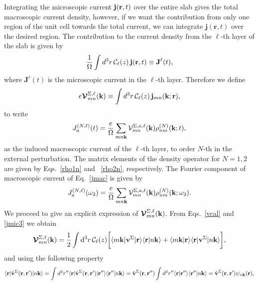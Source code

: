 \documentclass{article}
\begin{document}
Integrating the microscopic current $\mathbf{j}(\mathbf{r},t)$ over
the entire slab gives the total macroscopic current density, 
 however, if we want the
contribution from only one region of the unit cell towards the total
current, we can integrate $\mathbf{j}({\mathbf r},t)$ over the
desired region. The contribution to the current density from the
$\ell$-th layer of the slab is given by
\begin{equation}\label{jsz}
\frac{1}{\Omega}\int d^3r\, {\mathbf{\cal C}}_\ell(z)\, \mathbf{j}(\mathbf{r},t)
 \equiv \mathbf{J}^{\ell}(t),
\end{equation}
where $\mathbf{J}^{\ell}(t)$ is the microscopic current  in the
$\ell$-th layer.
Therefore we define
\begin{equation}\label{vcal}
e{\boldsymbol{\mathcal{V}}}^{\Sigma,\ell}_{mn}(\mathbf{k})
\equiv
\int d^3r\, {\mathbf{\cal C}}_\ell(z)\,\mathbf{j}_{mn}({\mathbf{k}};\mathbf{r}),
\end{equation}
to write
\begin{equation}\label{jmac}
J_a^{(N,\ell)}(t)=\frac{e}{\Omega}
\sum_{mn\mathbf{k}}
\mathcal{V}^{\Sigma,a,\ell}_{mn}(\mathbf{k})
\rho^{(N)}_{nm}(\mathbf{k};t),
\end{equation}
as the induced macroscopic current of the  $\ell$-th layer,
 to order $N$-th in the external
perturbation.
 The matrix elements of the
density operator for $N=1,2$ are given by Eqs.~\eqref{rho1n} and
~\eqref{rho2n}, respectively. 
The Fourier component of macroscopic current of Eq.~\eqref{jmac} is given by
\begin{equation}\label{jmac2}
J_{\mathrm{a}}^{(N,\ell)}(\omega_3)=\frac{e}{\Omega}
\sum_{mn\mathbf{k}}
{\mathbf{\cal V}}^{\Sigma,\mathrm{a},\ell}_{mn}(\mathbf{k})
\rho^{(N)}_{nm}(\mathbf{k};\omega_3)
.
\end{equation}
We proceed to give an explicit expression of
$\boldsymbol{\mathcal{\cal V}}^{\Sigma,\ell}_{mn}(\mathbf{k})$.
From
Eqs.~\eqref{vcal} and \eqref{jmic3} we obtain
\begin{equation}\label{intj}
{\boldsymbol{\mathcal{V}}}^{\Sigma,\ell}_{mn}({\mathbf k})=
\frac{1}{2}
\int \mathrm{d}^3 r\,
 {\mathbf{\cal C}}_\ell(z)
\bigg[
\langle m\mathbf{k}|\mathbf{v}^\Sigma | \mathbf{r}\rangle
\langle \mathbf{r} | n \mathbf k \rangle +
\langle m\mathbf{k} | \mathbf{r}\rangle
\langle \mathbf{r} | \mathbf{v}^\Sigma | n \mathbf k \rangle\bigg]
,
\end{equation}  
and using the following property
\begin{equation}\label{nl.2}
\langle \mathbf{r} | \hat{\mathbf{v}}^\Sigma(\mathbf{r},\mathbf{r}')| n\mathbf{k} \rangle
=\int d^3 r'' \langle \mathbf{r} |\hat{\mathbf{v}}^\Sigma(\mathbf{r},\mathbf{r}')| \mathbf{r}'' \rangle
\langle {\mathbf{r}''} | {n\mathbf{k}} \rangle
=\hat{\mathbf{v}}^\Sigma(\mathbf{r},\mathbf{r}'')
\int d^3 r'' \langle {\mathbf{r}} | {\mathbf{r}''} \rangle
\langle {\mathbf{r}''} | {n\mathbf{k}} \rangle
=\hat{\mathbf{v}}^\Sigma(\mathbf{r},\mathbf{r}')
\psi_{n\mathbf{k}}(\mathbf{r})
,
\end{equation}
\end{document}
